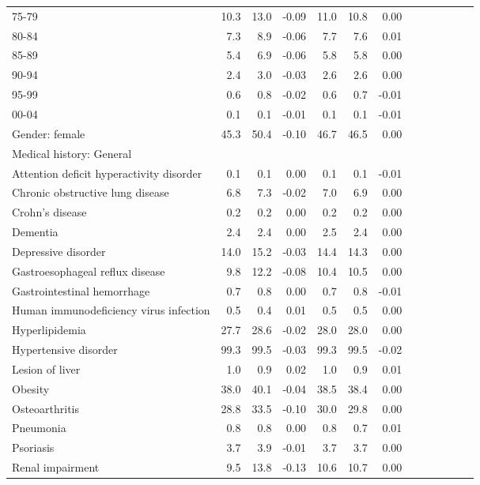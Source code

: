 \documentclass[11pt,]{article}
\begin{document}
\begin{longtable}{lrrrrrrrrrrrr}
      75-79 & 10.3 &  13.0 & -0.09 & 11.0 &  10.8 &  0.00 \\ 
      80-84 &  7.3 &   8.9 & -0.06 &  7.7 &   7.6 &  0.01 \\ 
      85-89 &  5.4 &   6.9 & -0.06 &  5.8 &   5.8 &  0.00 \\ 
      90-94 &  2.4 &   3.0 & -0.03 &  2.6 &   2.6 &  0.00 \\ 
      95-99 &  0.6 &   0.8 & -0.02 &  0.6 &   0.7 & -0.01 \\ 
      00-04 &  0.1 &   0.1 & -0.01 &  0.1 &   0.1 & -0.01 \\ 
  Gender: female & 45.3 &  50.4 & -0.10 & 46.7 &  46.5 &  0.00 \\ 
  Medical history: General &    &     &     &    &     &     \\ 
      Attention deficit hyperactivity disorder &  0.1 &   0.1 &  0.00 &  0.1 &   0.1 & -0.01 \\ 
      Chronic obstructive lung disease &  6.8 &   7.3 & -0.02 &  7.0 &   6.9 &  0.00 \\ 
      Crohn's disease &  0.2 &   0.2 &  0.00 &  0.2 &   0.2 &  0.00 \\ 
      Dementia &  2.4 &   2.4 &  0.00 &  2.5 &   2.4 &  0.00 \\ 
      Depressive disorder & 14.0 &  15.2 & -0.03 & 14.4 &  14.3 &  0.00 \\ 
      Gastroesophageal reflux disease &  9.8 &  12.2 & -0.08 & 10.4 &  10.5 &  0.00 \\ 
      Gastrointestinal hemorrhage &  0.7 &   0.8 &  0.00 &  0.7 &   0.8 & -0.01 \\ 
      Human immunodeficiency virus infection &  0.5 &   0.4 &  0.01 &  0.5 &   0.5 &  0.00 \\ 
      Hyperlipidemia & 27.7 &  28.6 & -0.02 & 28.0 &  28.0 &  0.00 \\ 
      Hypertensive disorder & 99.3 &  99.5 & -0.03 & 99.3 &  99.5 & -0.02 \\ 
      Lesion of liver &  1.0 &   0.9 &  0.02 &  1.0 &   0.9 &  0.01 \\ 
      Obesity & 38.0 &  40.1 & -0.04 & 38.5 &  38.4 &  0.00 \\ 
      Osteoarthritis & 28.8 &  33.5 & -0.10 & 30.0 &  29.8 &  0.00 \\ 
      Pneumonia &  0.8 &   0.8 &  0.00 &  0.8 &   0.7 &  0.01 \\ 
      Psoriasis &  3.7 &   3.9 & -0.01 &  3.7 &   3.7 &  0.00 \\ 
      Renal impairment &  9.5 &  13.8 & -0.13 & 10.6 &  10.7 &  0.00 \\ 

\end{longtable}
\end{document}
